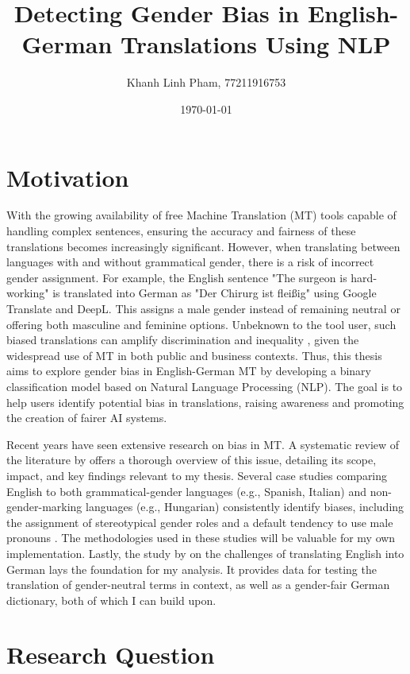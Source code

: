 \documentclass[oneside, paper=A4, DIV=15]{scrartcl}
\title{Detecting Gender Bias in English-German Translations Using NLP}
\author{Khanh Linh Pham, 77211916753}
\affil{Supervisor: Prof. Dr. Diana Hristova}
\affil{Hochschule für Wirtschaft und Recht Berlin}
\date{\today}
\begin{document}
\maketitle

\section{Motivation}
With the growing availability of free Machine Translation (MT) tools capable of handling complex sentences, ensuring the accuracy and fairness of these translations becomes increasingly significant. However, when translating between languages with and without grammatical gender, there is a risk of incorrect gender assignment. For example, the English sentence "The surgeon is hard-working" is translated into German as "Der Chirurg ist fleißig" using Google Translate and DeepL. This assigns a male gender instead of remaining neutral or offering both masculine and feminine options. Unbeknown to the tool user, such biased translations can amplify discrimination and inequality \parencite{braccini_does_2024}, given the widespread use of MT in both public and business contexts. Thus, this thesis aims to explore gender bias in English-German MT by developing a binary classification model based on Natural Language Processing (NLP). The goal is to help users identify potential bias in translations, raising awareness and promoting the creation of fairer AI systems.


Recent years have seen extensive research on bias in MT. A systematic review of the literature by \textcite{shrestha_exploring_2022} offers a thorough overview of this issue, detailing its scope, impact, and key findings relevant to my thesis. Several case studies comparing English to both grammatical-gender languages (e.g., Spanish, Italian) and non-gender-marking languages (e.g., Hungarian) consistently identify biases, including the assignment of stereotypical gender roles and a default tendency to use male pronouns \parencite{stanovsky_evaluating_2019, prates_assessing_2019, braccini_does_2024}. The methodologies used in these studies will be valuable for my own implementation. Lastly, the study by \textcite{lardelli_building_2024} on the challenges of translating English into German lays the foundation for my analysis. It provides data for testing the translation of gender-neutral terms in context, as well as a gender-fair German dictionary, both of which I can build upon.


\section{Research Question}
\end{document}

